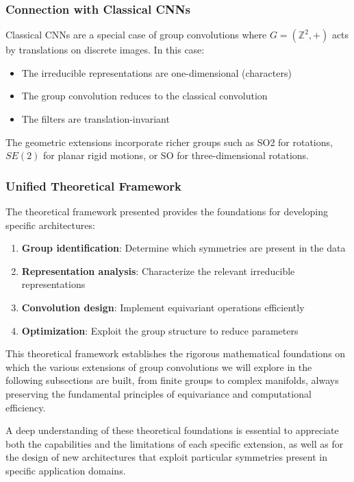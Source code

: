\subsubsection{Connection with Classical CNNs}

Classical \glspl{CNN} are a special case of group convolutions where $G = (\mathbb{Z}^2, +)$ acts by translations on discrete images. In this case:

\begin{itemize}
    \item The irreducible representations are one-dimensional (characters)
    \item The group convolution reduces to the classical convolution
    \item The filters are translation-invariant
\end{itemize}

The geometric extensions incorporate richer groups such as \gls{SO2} for rotations, $SE(2)$ for planar rigid motions, or \gls{SO} for three-dimensional rotations.

\subsubsection{Unified Theoretical Framework}

The theoretical framework presented provides the foundations for developing specific architectures:

\begin{enumerate}
    \item \textbf{Group identification}: Determine which symmetries are present in the data
    \item \textbf{Representation analysis}: Characterize the relevant irreducible representations
    \item \textbf{Convolution design}: Implement equivariant operations efficiently
    \item \textbf{Optimization}: Exploit the group structure to reduce parameters
\end{enumerate}

This theoretical framework establishes the rigorous mathematical foundations on which the various extensions of group convolutions we will explore in the following subsections are built, from finite groups to complex manifolds, always preserving the fundamental principles of equivariance and computational efficiency.

A deep understanding of these theoretical foundations is essential to appreciate both the capabilities and the limitations of each specific extension, as well as for the design of new architectures that exploit particular symmetries present in specific application domains.

